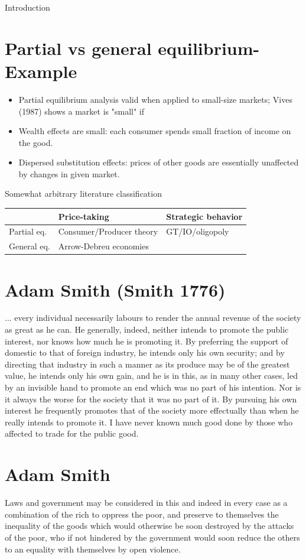 \documentclass[10pt]{article}
\begin{document}
Introduction

\section*{Partial vs general equilibrium-Example}
\begin{itemize}
  \item Partial equilibrium analysis valid when applied to small-size markets; Vives (1987) shows a market is "small" if
  \item Wealth effects are small: each consumer spends small fraction of income on the good.
  \item Dispersed substitution effects: prices of other goods are essentially unaffected by changes in given market.
\end{itemize}

Somewhat arbitrary literature classification

\begin{center}
\begin{tabular}{lll}
 & Price-taking & Strategic behavior \\
\hline
Partial eq. & Consumer/Producer theory & GT/IO/oligopoly \\
\hline
General eq. & Arrow-Debreu economies &  \\
\hline
\end{tabular}
\end{center}

\section*{Adam Smith (Smith 1776)}
... every individual necessarily labours to render the annual revenue of the society as great as he can. He generally, indeed, neither intends to promote the public interest, nor knows how much he is promoting it. By preferring the support of domestic to that of foreign industry, he intends only his own security; and by directing that industry in such a manner as its produce may be of the greatest value, he intends only his own gain, and he is in this, as in many other cases, led by an invisible hand to promote an end which was no part of his intention. Nor is it always the worse for the society that it was no part of it. By pursuing his own interest he frequently promotes that of the society more effectually than when he really intends to promote it. I have never known much good done by those who affected to trade for the public good.

\section*{Adam Smith}
Laws and government may be considered in this and indeed in every case as a combination of the rich to oppress the poor, and preserve to themselves the inequality of the goods which would otherwise be soon destroyed by the attacks of the poor, who if not hindered by the government would soon reduce the others to an equality with themselves by open violence.
\end{document}
